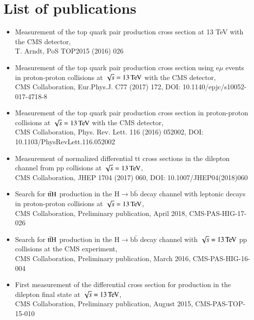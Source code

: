 
\chapter{List of publications}

\begin{itemize}

\item Measurement of the top quark pair production cross section at 13 TeV with the CMS detector, \\
T. Arndt, PoS TOP2015 (2016) 026

\item Measurement of the top quark pair production cross section using e$\mu$ events in proton-proton
collisions at $\sqrt{s}= 13 \,\text{Te\hspace{-.08em}V}$ with the CMS detector, \\
CMS Collaboration, Eur.Phys.J. C77 (2017) 172, DOI: 10.1140/epjc/s10052-017-4718-8

\item Measurement of the top quark pair production cross section in proton-proton collisions at $\sqrt{s}= 13 \,\text{Te\hspace{-.08em}V}$ with the CMS detector, \\
CMS Collaboration, Phys. Rev. Lett. 116 (2016) 052002, DOI: 10.1103/PhysRevLett.116.052002

\item Measurement of normalized differential tt cross sections in the dilepton channel from pp
collisions at $\sqrt{s}= 13 \,\text{Te\hspace{-.08em}V}$, \\
CMS Collaboration, JHEP 1704 (2017) 060, DOI: 10.1007/JHEP04(2018)060

\item Search for $\mathrm{t}\bar{\mathrm{t}}\mathrm{H}$ production in the $\mathrm{H}\rightarrow\mathrm{b}\bar{\mathrm{b}}$ decay channel with leptonic \ttbar decays in proton-proton
collisions at $\sqrt{s}= 13 \,\text{Te\hspace{-.08em}V}$, \\
CMS Collaboration, Preliminary publication, April 2018, CMS-PAS-HIG-17-026

\item Search for $\mathrm{t}\bar{\mathrm{t}}\mathrm{H}$ production in the $\mathrm{H}\rightarrow\mathrm{b}\bar{\mathrm{b}}$ decay channel with $\sqrt{s}= 13 \,\text{Te\hspace{-.08em}V}$ pp collisions at the CMS
experiment,\\
CMS Collaboration, Preliminary publication, March 2016, CMS-PAS-HIG-16-004

\item First measurement of the differential cross section for \ttbar production in the dilepton final
state at $\sqrt{s}= 13 \,\text{Te\hspace{-.08em}V}$, \\
CMS Collaboration, Preliminary publication, August 2015, CMS-PAS-TOP-15-010

\end{itemize}



